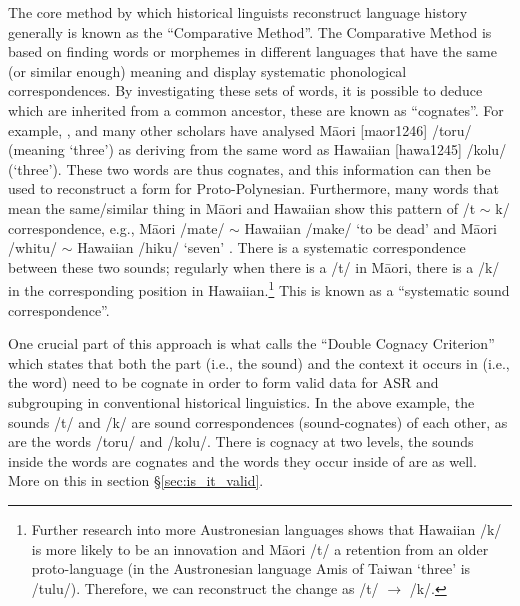 \documentclass[12pt,letterpaper]{article}
\begin{document}
The core method by which historical linguists reconstruct language history generally is known as the ``Comparative Method''. The Comparative Method is based on finding words or morphemes in different languages that have the same (or similar enough) meaning and display systematic phonological correspondences. By investigating these sets of words, it is possible to deduce which are inherited from a common ancestor, these are known as ``cognates''. For example, \citet{blust2004}, \citet{greenhill2011pollex} and many other scholars have analysed M\={a}ori [maor1246] /toru/ (meaning `three') as deriving from the same word as Hawaiian [hawa1245] /kolu/ (`three'). These two words are thus cognates, and this information can then be used to reconstruct a form for Proto-Polynesian. Furthermore, many words that mean the same/similar thing in M\={a}ori and Hawaiian show this pattern of /t $\sim$ k/ correspondence, e.g., M\={a}ori /mate/ $\sim$ Hawaiian /make/ `to be dead' and M\={a}ori /whitu/ $\sim$ Hawaiian /hiku/ `seven' \citep{ABVD}. There is a systematic correspondence between these two sounds; regularly when there is a /t/ in M\={a}ori, there is a /k/ in the corresponding position in Hawaiian.\footnote{Further research into more Austronesian languages shows that Hawaiian /k/ is more likely to be an innovation and M\={a}ori /t/ a retention from an older proto-language (in the Austronesian language Amis of Taiwan `three' is /tulu/). Therefore, we can reconstruct the change as /t/ $\rightarrow$ /k/.} This is known as a ``systematic sound correspondence''. 

One crucial part of this approach is what \citet{walkden_2013} calls the ``Double Cognacy Criterion'' which states that both the part (i.e., the sound) and the context it occurs in (i.e., the word) need to be cognate in order to form valid data for ASR and subgrouping in conventional historical linguistics. In the above example, the sounds /t/ and /k/ are sound correspondences (sound-cognates) of each other, as are the words /toru/ and /kolu/. There is cognacy at two levels, the sounds inside the words are cognates and the words they occur inside of are as well. More on this in section §\ref{sec:is_it_valid}.

\end{document}

